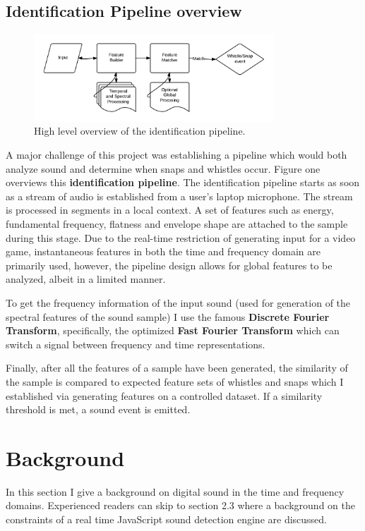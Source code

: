 \documentclass[DIV=calc, paper=a4, fontsize=11pt, twocolumn]{scrartcl}   %
\begin{document}
\subsection{Identification Pipeline overview}
\begin{figure}[h]
\centering
\includegraphics[width=90mm]{figures/HighLevelPipeline.png}
\caption{High level overview of the identification pipeline.}
\label{overflow}
\end{figure}
A major challenge of this project was establishing a pipeline which would both analyze sound and determine when snaps and whistles occur. Figure one overviews this \textbf{identification pipeline}.  The identification pipeline starts as soon as a stream of audio is established from a user's laptop microphone. The stream is processed in segments in a local context. A set of features such as energy, fundamental frequency, flatness and envelope shape are attached to the sample during this stage. Due to the real-time restriction of generating input for a video game, instantaneous features in both the time and frequency domain are primarily used, however, the pipeline design allows for global features to be analyzed, albeit in a limited manner.
\par To get the frequency information of the input sound (used for generation of the spectral features of the sound sample) I use the famous \textbf{Discrete Fourier Transform}, specifically,  the optimized \textbf{Fast Fourier Transform}  which can switch a signal between frequency and time representations.
\par Finally, after all the features of a sample have been generated, the similarity of the sample is compared to expected feature sets of whistles and snaps which I established via generating features on a controlled dataset. If a similarity threshold is met, a sound event is emitted.





\section{Background}
In this section I give a background on digital sound in the time and frequency domains. Experienced readers can skip to section 2.3 where a background on the constraints of a real time JavaScript sound detection engine are discussed.
\end{document}
